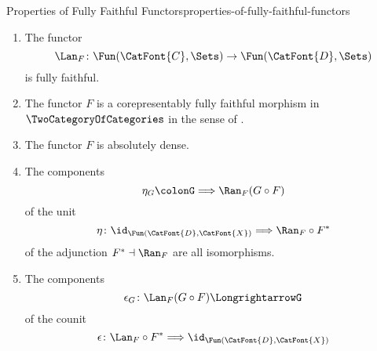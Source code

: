 \begin{proposition}{Properties of Fully Faithful Functors}{properties-of-fully-faithful-functors}
\begin{enumerate}
\begin{enumerate}
\[                        \Fun(\CatFont{D},\Sets)
                        \to
                        \Fun(\CatFont{C},\Sets)
                    \]%
                    is fully faithful.
                \item\label{properties-of-fully-faithful-functors-interaction-with-precomposition-4-c}The functor
                    \[
                        \Lan_{F}%
                        \colon
                        \Fun(\CatFont{C},\Sets)
                        \to
                        \Fun(\CatFont{D},\Sets)
                    \]%
                    is fully faithful.
                \item\label{properties-of-fully-faithful-functors-interaction-with-precomposition-4-d}The functor $F$ is a corepresentably fully faithful morphism in $\TwoCategoryOfCategories$ in the sense of .
                \item\label{properties-of-fully-faithful-functors-interaction-with-precomposition-4-e}The functor $F$ is absolutely dense.
                \item\label{properties-of-fully-faithful-functors-interaction-with-precomposition-4-f}The components
                    \[
                        \eta_{G}%
                        \colon%
                        G%
                        \Longrightarrow%
                        \Ran_{F}(G\circ F)%
                    \]%
                    of the unit
                    \[
                        \eta%
                        \colon%
                        \id_{\Fun(\CatFont{D},\CatFont{X})}%
                        \Longrightarrow%
                        \Ran_{F}\circ F^{*}%
                    \]%
                    of the adjunction $F^{*}\dashv\Ran_{F}$ are all isomorphisms.
                \item\label{properties-of-fully-faithful-functors-interaction-with-precomposition-4-g}The components
                    \[
                        \epsilon_{G}%
                        \colon%
                        \Lan_{F}(G\circ F)%
                        \Longrightarrow%
                        G%
                    \]%
                    of the counit
                    \[
                        \epsilon%
                        \colon%
                        \Lan_{F}\circ F^{*}%
                        \Longrightarrow%
                        \id_{\Fun(\CatFont{D},\CatFont{X})}%
\]
\end{enumerate}
\end{enumerate}
\end{proposition}
